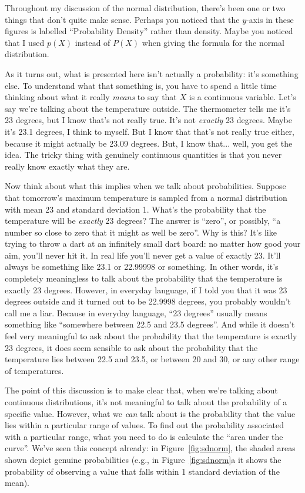 Throughout my discussion of the normal distribution, there's been one or two things that don't quite make sense. Perhaps you noticed that the $y$-axis in these figures is labelled ``Probability Density'' rather than density. Maybe you noticed that I used $p(X)$ instead of $P(X)$ when giving the formula for the normal distribution. 

As it turns out, what is presented here isn't actually a probability: it's something else. To understand what that something is, you have to spend a little time thinking about what it really {\it means} to say that $X$ is a continuous variable. Let's say we're talking about the temperature outside. The thermometer tells me it's 23 degrees, but I know that's not really true. It's not {\it exactly} 23 degrees. Maybe it's 23.1 degrees, I think to myself. But I know that that's not really true either, because it might actually be 23.09 degrees. But, I know that... well, you get the idea. The tricky thing with genuinely continuous quantities is that you never really know exactly what they are.

Now think about what this implies when we talk about probabilities. Suppose that tomorrow's maximum temperature is sampled from a normal distribution with mean 23 and standard deviation 1. What's the probability that the temperature will be {\it exactly} 23 degrees? The answer is ``zero'', or possibly, ``a number so close to zero that it might as well be zero''. Why is this? It's like trying to throw a dart at an infinitely small dart board: no matter how good your aim, you'll never hit it. In real life you'll never get a value of exactly 23. It'll always be something like 23.1 or 22.99998 or something. In other words, it's completely meaningless to talk about the probability that the temperature is exactly 23 degrees. However, in everyday language, if I told you that it was 23 degrees outside and it turned out to be 22.9998 degrees, you probably wouldn't call me a liar. Because in everyday language, ``23 degrees'' usually means something like ``somewhere between 22.5 and 23.5 degrees''. And while it doesn't feel very meaningful to ask about the probability that the temperature is exactly 23 degrees, it does seem sensible to ask about the probability that the temperature lies between 22.5 and 23.5, or between 20 and 30, or any other range of temperatures. 

The point of this discussion is to make clear that, when we're talking about continuous distributions, it's not meaningful to talk about the probability of a specific value. However, what we {\it can} talk about is the probability that the value lies within a particular range of values. To find out the probability associated with a particular range, what you need to do is calculate the ``area under the curve''. We've seen this concept already: in Figure~\ref{fig:sdnorm}, the shaded areas shown depict genuine probabilities (e.g., in Figure~\ref{fig:sdnorm}a it shows the probability of observing a value that falls within 1 standard deviation of the mean). 

